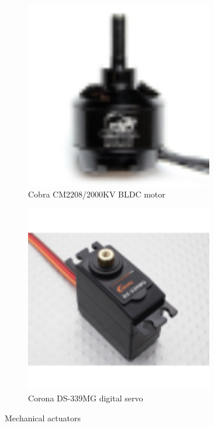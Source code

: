 \begin{figure}[htbp]
\begin{subfigure}{0.5\textwidth}
\centering
\includegraphics[width=0.9\textwidth]{figs/cobra-motor}
\caption{Cobra CM2208/2000KV BLDC motor}
\label{fig:cobra}
\end{subfigure}
\begin{subfigure}{0.5\textwidth}
\centering
\includegraphics[width=0.9\textwidth]{figs/corona-servo}
\caption{Corona DS-339MG digital servo}
\label{fig:corona}
\end{subfigure}
\caption{Mechanical actuators}
\end{figure}
